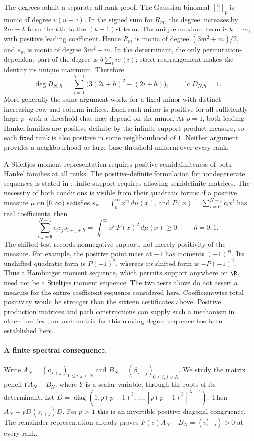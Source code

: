 The degrees admit a separate all-rank proof. The Gaussian binomial
$\genfrac{[}{]}{0pt}{}{u}{v}_p$ is monic of degree $v(u-v)$. In the signed sum for $R_m$,
the degree increases by $2m-k$ from the $k$th to the $(k+1)$st term.
The unique maximal term is $k=m$, with positive leading coefficient.
Hence $R_m$ is monic of degree $(3m^2+m)/2$, and $s_m$ is monic of
degree $3m^2-m$. In the determinant, the only permutation-dependent
part of the degree is $6\sum_i i\sigma(i)$; strict rearrangement makes
the identity its unique maximum. Therefore
\[
 \deg D_{N,h}=\sum_{i=0}^{N-1}\bigl(3(2i+h)^2-(2i+h)\bigr),
 \qquad \operatorname{lc}D_{N,h}=1.
\]
More generally the same argument works for a fixed minor with distinct
increasing row and column indices. Each such minor is positive for all
sufficiently large $p$, with a threshold that may depend on the minor.
At $p=1$, both leading Hankel families are positive definite by the
infinite-support product measure, so each fixed rank is also positive in
some neighbourhood of $1$. Neither argument provides a neighbourhood or
large-base threshold uniform over every rank.

A Stieltjes moment representation requires positive semidefiniteness of
both Hankel families at all ranks. The positive-definite formulation
for nondegenerate sequences is stated in
\cite[Lemma~2.1, p.~4]{wangzhu2016}; finite support requires allowing
semidefinite matrices. The necessity of both conditions is visible
from their quadratic forms:
if a positive measure $\mu$ on $[0,\infty)$ satisfies
$s_m=\int_0^\infty x^m\,d\mu(x)$, and
$P(x)=\sum_{i=0}^{N-1}c_ix^i$ has real coefficients, then
\[
 \sum_{i,j=0}^{N-1}c_ic_j s_{i+j+h}
 =\int_0^\infty x^hP(x)^2\,d\mu(x)\ge0,
 \qquad h=0,1.
\]
The shifted test records nonnegative support, not merely positivity
of the measure. For example, the positive point mass at $-1$ has
moments $(-1)^m$. Its unshifted quadratic form is $P(-1)^2$, whereas
its shifted form is $-P(-1)^2$. Thus a Hamburger moment sequence,
which permits support anywhere on $\R$, need not be a Stieltjes
moment sequence. The two tests above do not assert a measure for the
entire coefficient sequence considered here.
Coefficientwise total positivity would be stronger than the sixteen
certificates above. Positive production matrices and path constructions
can supply such a mechanism in other families
\cite[Sec.~2]{lrz2017}\cite[Thms.~9.7--9.8]{psz2023}; no such matrix for
this moving-degree sequence has been established here.

\paragraph{A finite spectral consequence.}
Write $A_N=(\alpha_{i+j})_{0\le i,j<N}$ and
$B_N=(\beta_{i+j})_{0\le i,j<N}$. We study the matrix pencil
$YA_N-B_N$, where $Y$ is a scalar variable, through the roots of its
determinant.
Let $D=\operatorname{diag}(1,p(p-1)^3,\ldots,[p(p-1)^3]^{N-1})$.
Then $A_N=pD(s_{i+j})D$. For $p>1$ this is an invertible positive diagonal
congruence. The remainder representation already proves
$F(p)A_N-B_N=(v^*_{i+j})>0$ at every rank.

